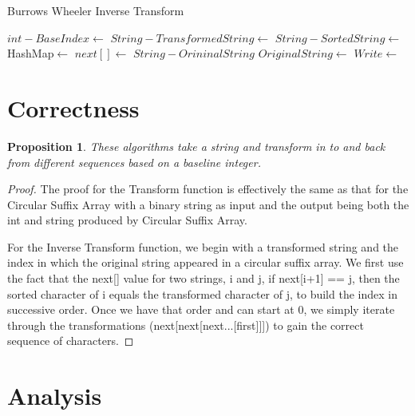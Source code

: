\documentclass[12pt]{article}
\newtheorem{proposition}[theorem]{Proposition}
\begin{document}
\begin{algorithm}[H]
\caption{Burrows Wheeler Inverse Transform}
\begin{algorithmic}
        \State $int- BaseIndex \gets$ 
        \State $String- TransformedString \gets$ 
        \State $String- SortedString \gets$ 
		\State HashMap$\gets$       
        		\State {}
        \EndFor
			\State $next[] \gets$ 
		\EndWhile        
        \State $String- OrininalString${}
            \State $OriginalString \gets$ 
        \EndFor
        \State $Write \gets$ 
    \EndProcedure
\end{algorithmic}
\end{algorithm}


\section{Correctness}

\begin{proposition}
These algorithms take a string and transform in to and back from different sequences based on a baseline integer.
\end{proposition}

\begin{proof}
The proof for the Transform function is effectively the same as that for the Circular Suffix Array with a binary string as input and the output being both the int and string produced by Circular Suffix Array. 

For the Inverse Transform function, we begin with a transformed string and the index in which the original string appeared in a circular suffix array. We first use the fact that the next[] value for two strings, i and j, if next[i+1] == j, then the sorted character of i equals the transformed character of j, to build the index in successive order. Once we have that order and can start at 0, we simply iterate through the transformations (next[next[next...[first]]]) to gain the correct sequence of characters.
\end{proof}

\section{Analysis}
\end{document}
